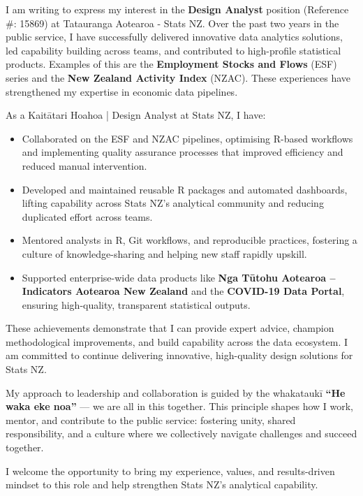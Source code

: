 I am writing to express my interest in the \textbf{Design Analyst} position (Reference {\#}: 15869) at Tatauranga Aotearoa - Stats NZ. Over the past two years in the public service, I have successfully delivered innovative data analytics solutions, led capability building across teams, and contributed to high-profile statistical products. Examples of this are the \textbf{Employment Stocks and Flows} (ESF) series and the \textbf{New Zealand Activity Index} (NZAC). These experiences have strengthened my expertise in economic data pipelines.

As a Kaitātari Hoahoa | Design Analyst at Stats NZ, I have:

\begin{itemize}
    \item Collaborated on the ESF and NZAC pipelines, optimising R-based workflows and implementing quality assurance processes that improved efficiency and reduced manual intervention.
    \item Developed and maintained reusable R packages and automated dashboards, lifting capability across Stats NZ’s analytical community and reducing duplicated effort across teams.
    \item Mentored analysts in R, Git workflows, and reproducible practices, fostering a culture of knowledge-sharing and helping new staff rapidly upskill.
    \item Supported enterprise-wide data products like \textbf{Nga Tūtohu Aotearoa – Indicators Aotearoa New Zealand} and the \textbf{COVID-19 Data Portal}, ensuring high-quality, transparent statistical outputs.
\end{itemize}

\noindent These achievements demonstrate that I can provide expert advice, champion methodological improvements, and build capability across the data ecosystem. I am committed to continue delivering innovative, high-quality design solutions for Stats NZ.

\noindent My approach to leadership and collaboration is guided by the whakataukī \textbf{“He waka eke noa”} — we are all in this together. This principle shapes how I work, mentor, and contribute to the public service: fostering unity, shared responsibility, and a culture where we collectively navigate challenges and succeed together.

\noindent I welcome the opportunity to bring my experience, values, and results-driven mindset to this role and help strengthen Stats NZ’s analytical capability.

